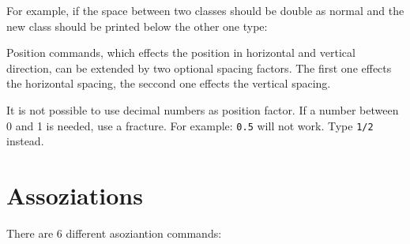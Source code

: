 \documentclass[parskip=full]{scrartcl}
\begin{document}
	For example, if the space between two classes should be double as normal and the new class should be printed below the other one type: 
	
	Position commands, which effects the position in horizontal and vertical direction, can be extended by two optional spacing factors. The first one effects the horizontal spacing, the seccond one effects the vertical spacing.
	
	\begin{attention}
		It is not possible to use decimal numbers as position factor. If a number between 0 and 1 is needed, use a fracture. For example: \texttt{0.5} will not work. Type \texttt{1/2} instead.
	\end{attention}

	\section{Assoziations}
	There are 6 different asoziantion commands:
	
\end{document}
